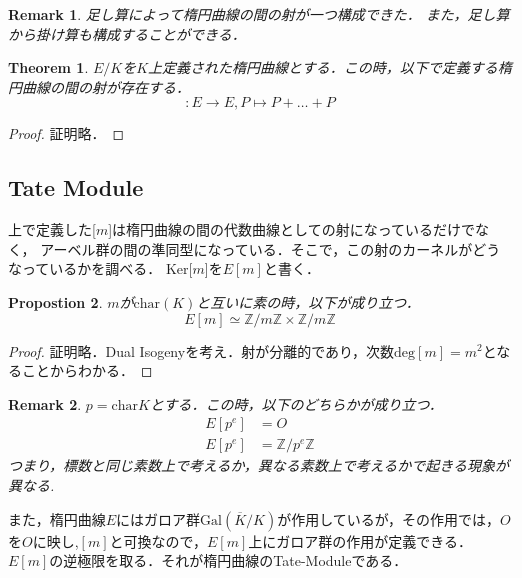 \documentclass{ujarticle}
\newtheorem{thm}{Theorem}[section]
\newtheorem{prop}[thm]{Propostion}
\newtheorem*{rem}{Remark}
\begin{document}
\begin{rem}
 足し算によって楕円曲線の間の射が一つ構成できた．
 また，足し算から掛け算も構成することができる．
\end{rem}

\begin{thm}
 $E/K$を$K$上定義された楕円曲線とする．この時，以下で定義する楕円曲線の間の射が存在する．
 \begin{equation*}
   [m]:E \to E, P \mapsto P + \dots +P
 \end{equation*}
\end{thm}
\begin{proof}
 証明略．
\end{proof}

\subsection{Tate Module}
\label{sub:Tate Module}
上で定義した[$m$]は楕円曲線の間の代数曲線としての射になっているだけでなく，
アーベル群の間の準同型になっている．そこで，この射のカーネルがどうなっているかを調べる．
Ker[$m$]を$E[m]$と書く．
\begin{prop}
  $m$が$\mathrm{char}(K)$と互いに素の時，以下が成り立つ．
  \begin{equation*}
   E[m] \simeq \mathbb{Z}/m \mathbb{Z} \times \mathbb{Z}/m \mathbb{Z}
  \end{equation*}
\end{prop}

\begin{proof}
 証明略．Dual Isogenyを考え．射が分離的であり，次数$\mathrm{deg}[m]=m^2$となることからわかる．
\end{proof}

\begin{rem}
  $p =\mathrm{char}K$とする．この時，以下のどちらかが成り立つ．
  \begin{align*}
  E[p^e]&={O} \\
  E[p^e]&=\mathbb{Z}/p^e \mathbb{Z}
\end{align*}
つまり，標数と同じ素数上で考えるか，異なる素数上で考えるかで起きる現象が異なる.
\end{rem}

また，楕円曲線$E$にはガロア群$\mathrm{Gal}(\overline{K}/K)$が作用しているが，その作用では，$O$を$O$に映し,$[m]$と可換なので，$E[m]$上にガロア群の作用が定義できる．
$E[m]$の逆極限を取る．それが楕円曲線のTate-Moduleである．
\end{document}

